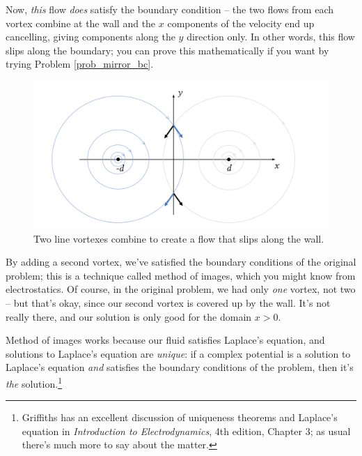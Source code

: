 Now, \emph{this} flow \emph{does} satisfy the boundary condition -- the two flows from each vortex combine at the wall and the $x$ components of the velocity end up cancelling, giving components along the $y$ direction only.  In other words, this flow slips along the boundary; you can prove this mathematically if you want by trying Problem \ref{prob_mirror_bc}.

\begin{figure}
\centering\includegraphics[width=\linewidth]{Figures/Chapter4/fig_mirror_image}
\caption{Two line vortexes combine to create a flow that slips along the wall.}
\label{fig_mirror_image}
\end{figure}

By adding a second vortex, we've satisfied the boundary conditions of the original problem; this is a technique called method of images, which you might know from electrostatics.  Of course, in the original problem, we had only \emph{one} vortex, not two -- but that's okay, since our second vortex is covered up by the wall.  It's not really there, and our solution is only good for the domain $x>0$.  

Method of images works because our fluid satisfies Laplace's equation, and solutions to Laplace's equation are \emph{unique}: if a complex potential is a solution to Laplace's equation \emph{and} satisfies the boundary conditions of the problem, then it's \emph{the} solution.\footnote{Griffiths has an excellent discussion of uniqueness theorems and Laplace's equation in \emph{Introduction to Electrodynamics}, 4th edition, Chapter 3; as usual there's much more to say about the matter.}

